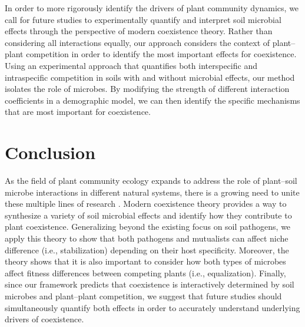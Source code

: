 In order to more rigorously identify the drivers of plant community dynamics, we call for future studies to experimentally quantify and interpret soil microbial effects through the perspective of modern coexistence theory.
Rather than considering all interactions equally, our approach considers the context of plant--plant competition in order to identify the most important effects for coexistence.
Using an experimental approach that quantifies both interspecific and intraspecific competition in soils with and without microbial effects, our method isolates the role of microbes. By modifying the strength of different interaction coefficients in a demographic model, we can then identify the specific mechanisms that are most important for coexistence.
\par



\section{Conclusion}
As the field of plant community ecology expands to address the role of plant--soil microbe interactions in different natural systems, there is a growing need to unite these multiple lines of research \citep{Mordecai2011, Peay2016}.
Modern coexistence theory provides a way to synthesize a variety of soil microbial effects and identify how they contribute to plant coexistence.
Generalizing beyond the existing focus on soil pathogens, we apply this theory to show that both pathogens and mutualists can affect niche difference (i.e., stabilization) depending on their host specificity.
Moreover, the theory shows that it is also important to consider how both types of microbes affect fitness differences between competing plants (i.e., equalization).
Finally, since our framework predicts that coexistence is interactively determined by soil microbes and plant--plant competition, we suggest that future studies should simultaneously quantify both effects in order to accurately understand underlying drivers of coexistence.
\par


